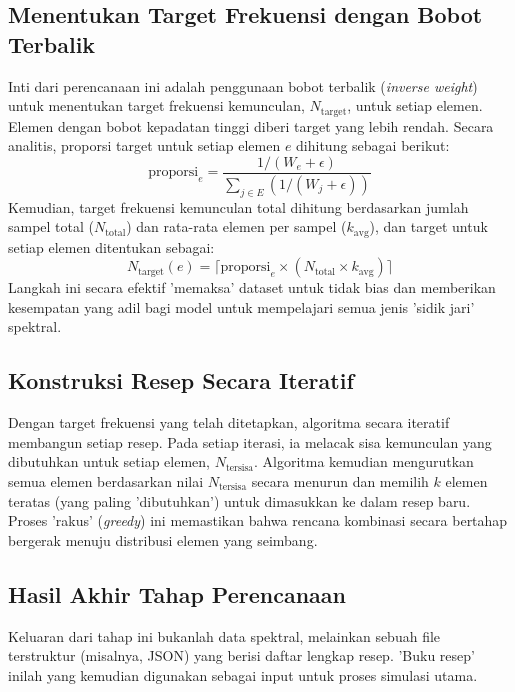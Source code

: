 \begin{onehalfspace}
\subsection*{Menentukan Target Frekuensi dengan Bobot Terbalik}
Inti dari perencanaan ini adalah penggunaan bobot terbalik (\textit{inverse weight}) untuk menentukan target frekuensi kemunculan, $N_{\text{target}}$, untuk setiap elemen. Elemen dengan bobot kepadatan tinggi diberi target yang lebih rendah. Secara analitis, proporsi target untuk setiap elemen $e$ dihitung sebagai berikut:
\begin{equation}
\text{proporsi}_e = \frac{1 / (W_e + \epsilon)}{\sum_{j \in E} (1 / (W_j + \epsilon))}
\end{equation}
Kemudian, target frekuensi kemunculan total dihitung berdasarkan jumlah sampel total ($N_{\text{total}}$) dan rata-rata elemen per sampel ($k_{\text{avg}}$), dan target untuk setiap elemen ditentukan sebagai:
\begin{equation}
N_{\text{target}}(e) = \lceil \text{proporsi}_e \times (N_{\text{total}} \times k_{\text{avg}}) \rceil
\end{equation}
Langkah ini secara efektif 'memaksa' dataset untuk tidak bias dan memberikan kesempatan yang adil bagi model untuk mempelajari semua jenis 'sidik jari' spektral.

\subsection*{Konstruksi Resep Secara Iteratif}
Dengan target frekuensi yang telah ditetapkan, algoritma secara iteratif membangun setiap resep. Pada setiap iterasi, ia melacak sisa kemunculan yang dibutuhkan untuk setiap elemen, $N_{\text{tersisa}}$. Algoritma kemudian mengurutkan semua elemen berdasarkan nilai $N_{\text{tersisa}}$ secara menurun dan memilih $k$ elemen teratas (yang paling 'dibutuhkan') untuk dimasukkan ke dalam resep baru. Proses 'rakus' (\textit{greedy}) ini memastikan bahwa rencana kombinasi secara bertahap bergerak menuju distribusi elemen yang seimbang.

\subsection*{Hasil Akhir Tahap Perencanaan}
Keluaran dari tahap ini bukanlah data spektral, melainkan sebuah file terstruktur (misalnya, JSON) yang berisi daftar lengkap resep. 'Buku resep' inilah yang kemudian digunakan sebagai input untuk proses simulasi utama.


\end{onehalfspace}
